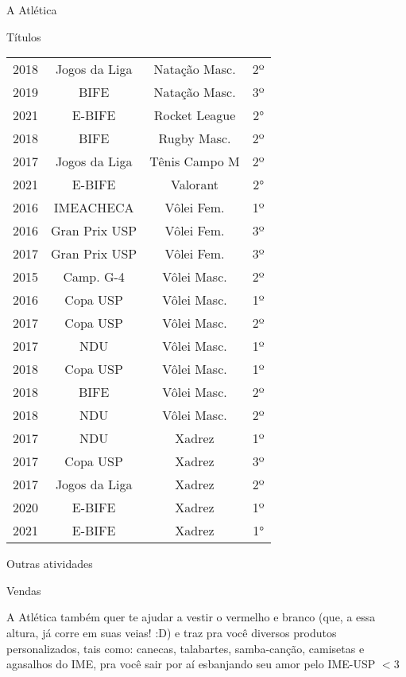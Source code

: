 \begin{secao}{A Atlética}
\begin{subsecao}{Títulos}
\begin{center}
\begin{tabular}{c|c|c|c}
    2018 & Jogos da Liga  & Natação Masc.   & 2º\\
    2019 & BIFE           & Natação Masc.   & 3º\\
    2021 & E-BIFE         & Rocket League   & 2°\\
    2018 & BIFE           & Rugby Masc.     & 2º\\
    2017 & Jogos da Liga  & Tênis Campo M   & 2º\\
    2021 & E-BIFE         & Valorant        & 2°\\
    2016 & IMEACHECA      & Vôlei Fem.      & 1º\\
    2016 & Gran Prix USP  & Vôlei Fem.      & 3º\\
    2017 & Gran Prix USP  & Vôlei Fem.      & 3º\\
    2015 & Camp. G-4      & Vôlei Masc.     & 2º\\
    2016 & Copa USP       & Vôlei Masc.     & 1º\\
    2017 & Copa USP       & Vôlei Masc.     & 2º\\
    2017 & NDU            & Vôlei Masc.     & 1º\\
    2018 & Copa USP       & Vôlei Masc.     & 1º\\
    2018 & BIFE           & Vôlei Masc.     & 2º\\
    2018 & NDU            & Vôlei Masc.     & 2º\\
    2017 & NDU            & Xadrez          & 1º\\
    2017 & Copa USP       & Xadrez          & 3º\\
    2017 & Jogos da Liga  & Xadrez          & 2º\\
    2020 & E-BIFE         & Xadrez          & 1º\\
    2021 & E-BIFE         & Xadrez          & 1°\\
  \end{tabular}
\end{center}

\end{subsecao}
\begin{subsecao}{Outras atividades}

\begin{subsubsecao}{Vendas}

A Atlética também quer te ajudar a vestir o vermelho e branco (que, a essa
altura, já corre em suas veias! :D) e traz pra você diversos produtos
personalizados, tais como: canecas, talabartes,
samba-canção, camisetas e agasalhos do
IME, pra você sair por aí esbanjando seu amor pelo IME-USP $<$3


\end{subsubsecao}
\end{subsecao}
\end{secao}
